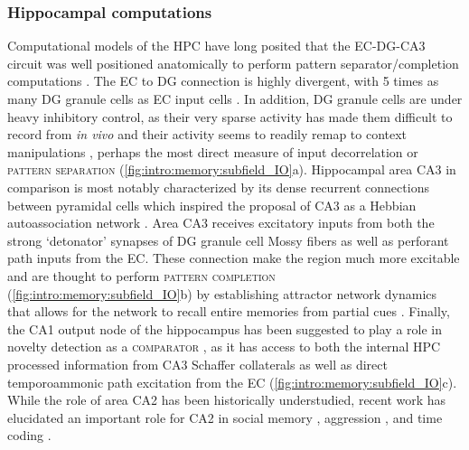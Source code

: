 \subsubsection{Hippocampal computations}
\label{sec:intro:memory:hpc_comp}
Computational models of the \ac{HPC} have long posited that the \ac{EC}-\ac{DG}-CA3 circuit was well positioned anatomically to perform pattern separator/completion computations \citep{Marr1971, Treves1994, Knierim2016}.
The \ac{EC} to \ac{DG} connection is highly divergent, with 5 times as many \ac{DG} granule cells as \ac{EC} input cells \cite{Amaral1990}.
In addition, \ac{DG} granule cells are under heavy inhibitory control, as their very sparse activity has made them difficult to record from \emph{in vivo} and their activity seems to readily remap to context manipulations \citep{Neunuebel2014, Leutgeb2007}, perhaps the most direct measure of input decorrelation or \textsc{pattern separation} (\autoref{fig:intro:memory:subfield_IO}a).
Hippocampal area CA3 in comparison is most notably characterized by its dense recurrent connections between pyramidal cells which inspired the proposal of CA3 as a Hebbian autoassociation network \citep{Marr1971}.
Area CA3 receives excitatory inputs from both the strong `detonator' synapses of \ac{DG} granule cell Mossy fibers as well as perforant path inputs from the \ac{EC}.
These connection make the region much more excitable and are thought to perform \textsc{pattern completion} (\autoref{fig:intro:memory:subfield_IO}b) by establishing attractor network dynamics that allows for the network to recall entire memories from partial cues \citep{Treves1992, Neunuebel2014}.
Finally, the CA1 output node of the hippocampus has been suggested to play a role in novelty detection as a \textsc{comparator} \citep{Vinogradova2001, Lisman2001}, as it has access to both the internal \ac{HPC} processed information from CA3 Schaffer collaterals as well as direct temporoammonic path excitation from the \ac{EC} (\autoref{fig:intro:memory:subfield_IO}c).
While the role of area CA2 has been historically understudied, recent work has elucidated an important role for CA2 in social memory \citep{Hitti2014}, aggression \citep{Wersinger2002}, and time coding \citep{Mankin2015}.


